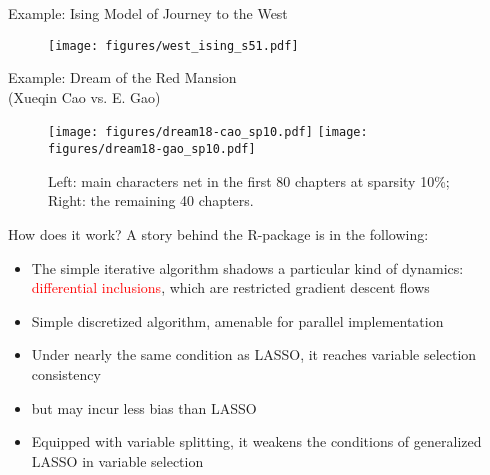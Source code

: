\documentclass[slidestop,compress,9pt,epsfig,color]{beamer}
\theoremstyle{example}
\begin{document}
%



%

\begin{frame}{Example: Ising Model of Journey to the West}
\begin{figure}[!h]
\texttt{[image: figures/west\_ising\_s51.pdf]}  \\
\end{figure}
\end{frame}

\begin{frame}{Example: Dream of the Red Mansion \\(Xueqin Cao vs. E. Gao)}
\begin{figure}[!h]
\texttt{[image: figures/dream18-cao\_sp10.pdf]} 
\texttt{[image: figures/dream18-gao\_sp10.pdf]}  
\caption{Left: main characters net in the first 80 chapters at sparsity 10\%; Right: the remaining 40 chapters.}
\end{figure}
\end{frame}


\begin{frame}{How does it work?}
A story behind the R-package is in the following:
\begin{itemize}
\item The simple iterative algorithm shadows a particular kind of dynamics: \textcolor{red}{differential inclusions}, which are restricted gradient descent flows
\item Simple discretized algorithm, amenable for parallel implementation
\item Under nearly the same condition as LASSO, it reaches variable selection consistency
\item but may incur less bias than LASSO
\item Equipped with variable splitting, it weakens the conditions of generalized LASSO in variable selection
\end{itemize}
\end{frame}
\end{document}
